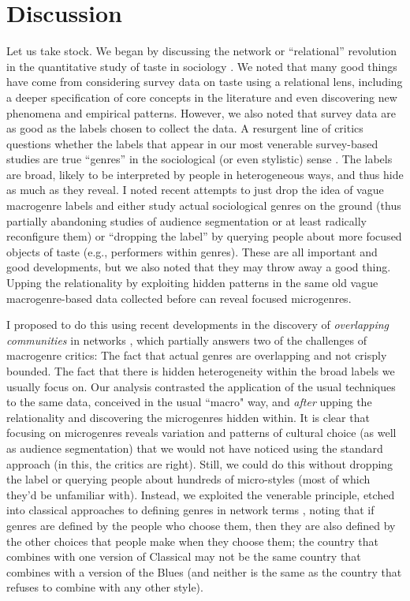 \documentclass[a4paper,12pt]{extarticle}
\begin{document}
\section{Discussion}
Let us take stock. We began by discussing the network or ``relational'' revolution in the quantitative study of taste in sociology \citep{pachucki2010cultural}. We noted that many good things have come from considering survey data on taste using a relational lens, including a deeper specification of core concepts in the literature and even discovering new phenomena and empirical patterns. However, we also noted that survey data are as good as the labels chosen to collect the data. A resurgent line of critics questions whether the labels that appear in our most venerable survey-based studies are true ``genres'' in the sociological (or even stylistic) sense \citep{lena2015relational, vlegels2015music}. The labels are broad, likely to be interpreted by people in heterogeneous ways, and thus hide as much as they reveal. I noted recent attempts to just drop the idea of vague macrogenre labels and either study actual sociological genres on the ground (thus partially abandoning studies of audience segmentation or at least radically reconfigure them) or ``dropping the label'' \citep{sonnett2016ambivalence} by querying people about more focused objects of taste (e.g., performers within genres). These are all important and good developments, but we also noted that they may throw away a good thing. Upping the relationality by exploiting hidden patterns in the same old vague macrogenre-based data collected before can reveal focused microgenres. 

I proposed to do this using recent developments in the discovery of \textit{overlapping communities} in networks \citep{ahn_etal10}, which partially answers two of the challenges of macrogenre critics: The fact that actual genres are overlapping and not crisply bounded. The fact that there is hidden heterogeneity within the broad labels we usually focus on. Our analysis contrasted the application of the usual techniques to the same data, conceived in the usual ``macro" way, and \textit{after} upping the relationality and discovering the microgenres hidden within. It is clear that focusing on microgenres reveals variation and patterns of cultural choice (as well as audience segmentation) that we would not have noticed using the standard approach (in this, the critics are right). Still, we could do this without dropping the label or querying people about hundreds of micro-styles (most of which they'd be unfamiliar with). Instead, we exploited the venerable principle, etched into classical approaches to defining genres in network terms \citep{dimaggio1987classification}, noting that if genres are defined by the people who choose them, then they are also defined by the other choices that people make when they choose them; the country that combines with one version of Classical may not be the same country that combines with a version of the Blues (and neither is the same as the country that refuses to combine with any other style). 
\end{document}
